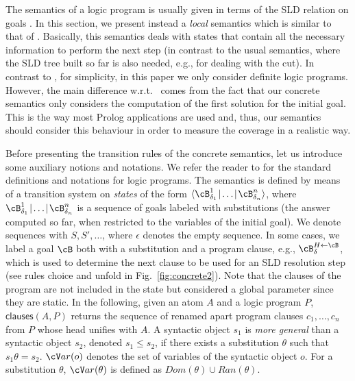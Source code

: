 \documentclass[fleqn]{tlp}
\newcommand{\sleq}{\leqslant}
\newcommand{\clauses}{\mathsf{clauses}}
\newcommand{\midd}{\!\mid\!}
\newcommand{\var}{{\cV}ar}
\def \tuple#1{\langle #1 \rangle}
\newcommand{\Dom}{\mathit{Dom}}
\newcommand{\Ran}{\mathit{Ran}}
\begin{document}
The semantics of a logic program is usually given in terms of the SLD
relation on goals \cite{Llo87}. In this section, we present instead a
\emph{local} semantics which is similar to that of
. Basically, this semantics deals with states that
contain all the necessary information to perform the next step (in
contrast to the usual semantics, where the SLD tree built so far is
also needed, e.g., for dealing with the cut).
In contrast to \cite{SESGF11}, for simplicity, in this paper we only
consider definite logic programs.
However, the main difference w.r.t.\ \cite{SESGF11} comes from the
fact that our concrete semantics only considers the computation of the
first solution for the initial goal. This is the way most Prolog
applications are used and, thus, our semantics should consider this
behaviour in order to measure the coverage in a realistic way.

Before presenting the transition rules of the concrete semantics, let
us introduce some auxiliary notions and notations. We refer
  the reader to \cite{Apt97} for the standard definitions and
  notations for logic programs.
The semantics is defined by means of a transition system on
\emph{states} of the form
$\tuple{\cB^1_{\delta_1}\midd\ldots\midd\cB^n_{\delta_n}}$, where
$\cB^1_{\delta_1}\midd\ldots\midd\cB^n_{\delta_n}$ is a sequence of
goals labeled with substitutions (the answer computed so far, when
restricted to the variables of the initial goal).  We denote sequences
with $S, S',\ldots$, where $\epsilon$ denotes the empty sequence.  In
some cases, we label a goal $\cB$ both with a substitution and a
program clause, e.g., $\cB_\delta^{H\leftarrow\cB}$, which is used to
determine the next clause to be used for an SLD resolution step (see
rules \textsf{choice} and \textsf{unfold} in Fig.~\ref{fig:concrete2}).
Note that the clauses of the program are not included in the state but
considered a global parameter since they are static.
In the following, given an atom $A$
and a logic program $P$, $\clauses(A,P)$
returns the sequence of renamed apart program clauses $c_1,\ldots,c_n$ 
from $P$ whose head unifies with $A$.
A syntactic object $s_1$ is \emph{more general} than a syntactic object
$s_2$, denoted $s_1 \sleq s_2$, if there exists a substitution
$\theta$ such that $s_1\theta = s_2$.
$\var(o)$ denotes the set of variables of the syntactic object $o$. 
For a substitution $\theta$, $\var(\theta)$ is defined as $\Dom(\theta)\cup\Ran(\theta)$.
\end{document}
